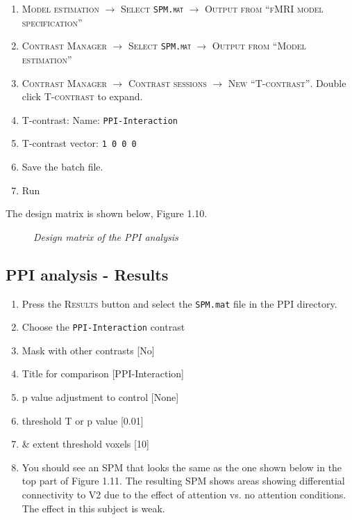 \begin{enumerate}
\item \textsc{Model estimation} $\rightarrow$ \textsc{Select \texttt{SPM.mat}} $\rightarrow$ \textsc{Output from ``fMRI model specification''}
\item \textsc{Contrast Manager} $\rightarrow$ \textsc{Select \texttt{SPM.mat}} $\rightarrow$ \textsc{Output from ``Model estimation''} 
\item \textsc{Contrast Manager} $\rightarrow$ \textsc{Contrast sessions} $\rightarrow$ \textsc{New ``T-contrast''}. Double click \textsc{T-contrast} to expand.
\item T-contrast: Name: \texttt{PPI-Interaction}
\item T-contrast vector: \texttt{1 0 0 0}
\item Save the batch file.
\item Run
\end{enumerate}
The design matrix is shown below, Figure 1.10.

\begin{figure}[ht]
\centering{}
\caption{\em Design matrix of the PPI analysis}
\label{ppi_fig10}
\end{figure}

\subsection{PPI analysis - Results}

\begin{enumerate}
\item Press the \textsc{Results} button and select the \texttt{SPM.mat} file in the PPI directory.
\item Choose the \texttt{PPI-Interaction} contrast
\item Mask with other contrasts [No]
\item Title for comparison [PPI-Interaction]
\item p value adjustment to control [None]
\item threshold {T or p value} [0.01]
\item \& extent threshold {voxels} [10]
\item You should see an SPM that looks the same as the one shown below in the top part of Figure 1.11. The resulting SPM shows areas showing differential connectivity to V2 due to the effect of attention vs. no attention conditions. The effect in this subject is weak.
\end{enumerate}

